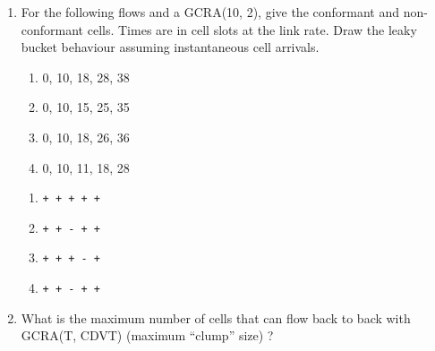 \begin{problem}
\begin{enumerate}
\item For the following flows and a GCRA(10, 2), give the conformant and
non-conformant cells. Times are in cell slots at the link rate. Draw
the leaky bucket behaviour assuming instantaneous cell arrivals.
 \begin{enumerate}
        \item  0, 10, 18, 28, 38

        \item  0, 10, 15, 25, 35

        \item  0, 10, 18, 26, 36

        \item  0, 10, 11, 18, 28
\end{enumerate}
\ifsol
\begin{enumerate}
        \item  \texttt{+ + + + +}
        \item  \texttt{+ + - + +}
        \item  \texttt{+ + + - +}
        \item  \texttt{+ + - + +}
\end{enumerate}
\fi
\item What is the maximum number of cells that can flow back to back
with GCRA(T, CDVT) (maximum ``clump'' size) ?
\end{enumerate}
\end{problem}
